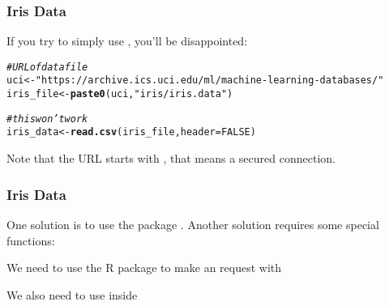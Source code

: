 \documentclass[12pt]{beamer}\usepackage[]{graphicx}\usepackage[]{color}
\makeatletter
\newcommand{\hlnum}[1]{\textcolor[rgb]{0.686,0.059,0.569}{#1}}%
\newcommand{\hlstr}[1]{\textcolor[rgb]{0.192,0.494,0.8}{#1}}%
\newcommand{\hlcom}[1]{\textcolor[rgb]{0.678,0.584,0.686}{\textit{#1}}}%
\newcommand{\hlstd}[1]{\textcolor[rgb]{0.345,0.345,0.345}{#1}}%
\newcommand{\hlkwb}[1]{\textcolor[rgb]{0.69,0.353,0.396}{#1}}%
\newcommand{\hlkwc}[1]{\textcolor[rgb]{0.333,0.667,0.333}{#1}}%
\newcommand{\hlkwd}[1]{\textcolor[rgb]{0.737,0.353,0.396}{\textbf{#1}}}%
\newenvironment{kframe}{%
 \def\at@end@of@kframe{}%
 \ifinner\ifhmode%
  \def\at@end@of@kframe{\end{minipage}}%
  \begin{minipage}{\columnwidth}%
 \fi\fi%
 \def\FrameCommand##1{\hskip\@totalleftmargin \hskip-\fboxsep
 \colorbox{shadecolor}{##1}\hskip-\fboxsep
     \hskip-\linewidth \hskip-\@totalleftmargin \hskip\columnwidth}%
 \MakeFramed {\advance\hsize-\width
   \@totalleftmargin\z@ \linewidth\hsize
   \@setminipage}}%
 {\par\unskip\endMakeFramed%
 \at@end@of@kframe}
\newenvironment{knitrout}{}{} %
\makeatother
\begin{document}
\begin{frame}[fragile]
\frametitle{Iris Data}

If you try to simply use , you'll be disappointed:
\eb
\begin{knitrout}\scriptsize
{}\color{fgcolor}\begin{kframe}
\begin{alltt}
\hlcom{# URL of data file}
\hlstd{uci} \hlkwb{<-} \hlstr{"https://archive.ics.uci.edu/ml/machine-learning-databases/"}
\hlstd{iris_file} \hlkwb{<-} \hlkwd{paste0}\hlstd{(uci,} \hlstr{"iris/iris.data"}\hlstd{)}
\end{alltt}
\end{kframe}
\end{knitrout}


\begin{knitrout}\scriptsize
{}\color{fgcolor}\begin{kframe}
\begin{alltt}
\hlcom{# this won't work}
\hlstd{iris_data} \hlkwb{<-} \hlkwd{read.csv}\hlstd{(iris_file,} \hlkwc{header} \hlstd{=} \hlnum{FALSE}\hlstd{)}
\end{alltt}
\end{kframe}
\end{knitrout}

Note that the URL starts with {\hilit {}}, that means a secured connection.

\end{frame}


\begin{frame}[fragile]
\frametitle{Iris Data}

One solution is to use the package . Another solution requires some special functions:
\bbi
 \item We need to use the R package {\hilit {}} to make an  request with {\hilit {}}
 \item We also need to use {\hilit {}} inside 
\ei

\end{frame}

\end{document}
